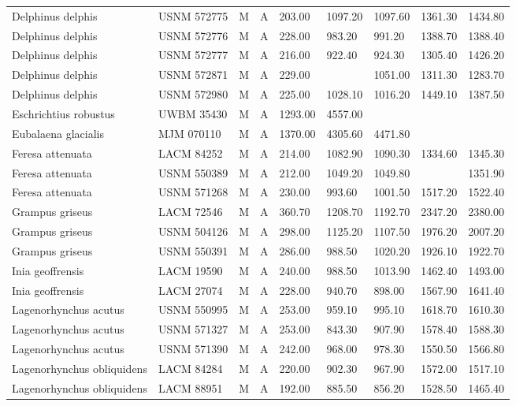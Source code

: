 \begin{longtable}{|p{1in}p{.8in}p{.25in}p{.25in}p{.5in}p{.5in}p{.5in}p{.5in}p{.55in}|}
  Delphinus delphis & USNM 572775 & M & A & 203.00 & 1097.20 & 1097.60 & 1361.30 & 1434.80 \\ 
  Delphinus delphis & USNM 572776 & M & A & 228.00 & 983.20 & 991.20 & 1388.70 & 1388.40 \\ 
  Delphinus delphis & USNM 572777 & M & A & 216.00 & 922.40 & 924.30 & 1305.40 & 1426.20 \\ 
  Delphinus delphis & USNM 572871 & M & A & 229.00 &  & 1051.00 & 1311.30 & 1283.70 \\ 
  Delphinus delphis & USNM 572980 & M & A & 225.00 & 1028.10 & 1016.20 & 1449.10 & 1387.50 \\ 
  Eschrichtius robustus & UWBM 35430 & M & A & 1293.00 & 4557.00 &  &  &  \\ 
  Eubalaena glacialis & MJM 070110 & M & A & 1370.00 & 4305.60 & 4471.80 &  &  \\ 
  Feresa attenuata & LACM 84252 & M & A & 214.00 & 1082.90 & 1090.30 & 1334.60 & 1345.30 \\ 
  Feresa attenuata & USNM 550389 & M & A & 212.00 & 1049.20 & 1049.80 &  & 1351.90 \\ 
  Feresa attenuata & USNM 571268 & M & A & 230.00 & 993.60 & 1001.50 & 1517.20 & 1522.40 \\ 
  Grampus griseus & LACM 72546 & M & A & 360.70 & 1208.70 & 1192.70 & 2347.20 & 2380.00 \\ 
  Grampus griseus & USNM 504126 & M & A & 298.00 & 1125.20 & 1107.50 & 1976.20 & 2007.20 \\ 
  Grampus griseus & USNM 550391 & M & A & 286.00 & 988.50 & 1020.20 & 1926.10 & 1922.70 \\ 
  Inia geoffrensis & LACM 19590 & M & A & 240.00 & 988.50 & 1013.90 & 1462.40 & 1493.00 \\ 
  Inia geoffrensis & LACM 27074 & M & A & 228.00 & 940.70 & 898.00 & 1567.90 & 1641.40 \\ 
  Lagenorhynchus acutus & USNM 550995 & M & A & 253.00 & 959.10 & 995.10 & 1618.70 & 1610.30 \\ 
  Lagenorhynchus acutus & USNM 571327 & M & A & 253.00 & 843.30 & 907.90 & 1578.40 & 1588.30 \\ 
  Lagenorhynchus acutus & USNM 571390 & M & A & 242.00 & 968.00 & 978.30 & 1550.50 & 1566.80 \\ 
  Lagenorhynchus obliquidens & LACM 84284 & M & A & 220.00 & 902.30 & 967.90 & 1572.00 & 1517.10 \\ 
  Lagenorhynchus obliquidens & LACM 88951 & M & A & 192.00 & 885.50 & 856.20 & 1528.50 & 1465.40 \\ 

\end{longtable}
